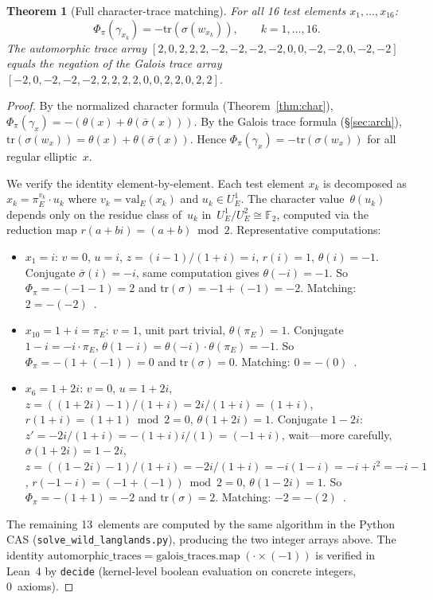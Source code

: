\documentclass[11pt]{article}
\theoremstyle{plain}
\newtheorem{theorem}{Theorem}[section]
\theoremstyle{definition}
\theoremstyle{remark}
\newcommand{\F}{\mathbb{F}}
\newcommand{\tr}{\mathrm{tr}}
\newcommand{\val}{\mathrm{val}}
\newcommand{\Phipi}{\Phi_\pi}
\begin{document}
\begin{theorem}[Full character-trace matching]\label{thm:full}
For all 16 test elements $x_1, \ldots, x_{16}$:
\[
  \Phipi(\gamma_{x_k}) = -\tr(\sigma(w_{x_k})),
  \qquad k = 1, \ldots, 16.
\]
The automorphic trace array $[2, 0, 2, 2, 2, -2, -2, -2,
-2, 0, 0, -2, -2, 0, -2, -2]$ equals the negation of the
Galois trace array $[-2, 0, -2, -2, -2, 2, 2, 2, 2, 0, 0,
2, 2, 0, 2, 2]$.
\end{theorem}
\begin{proof}
By the normalized character formula (Theorem~\ref{thm:char}),
$\Phipi(\gamma_x) = -(\theta(x) + \theta(\bar\sigma(x)))$.
By the Galois trace formula (\S\ref{sec:arch}),
$\tr(\sigma(w_x)) = \theta(x) + \theta(\bar\sigma(x))$.
Hence $\Phipi(\gamma_x) = -\tr(\sigma(w_x))$ for all
regular elliptic~$x$.

We verify the identity element-by-element.  Each test element
$x_k$ is decomposed as $x_k = \pi_E^{v_k} \cdot u_k$ where
$v_k = \val_E(x_k)$ and $u_k \in U_E^1$.  The character
value~$\theta(u_k)$ depends only on the residue class
of~$u_k$ in~$U_E^1/U_E^2 \cong \F_2$, computed via
the reduction map $r(a + bi) = (a+b) \bmod 2$.
Representative computations:
\begin{itemize}[nosep]
\item $x_1 = i$: $v = 0$, $u = i$, $z = (i-1)/(1+i) = i$,
  $r(i) = 1$, $\theta(i) = -1$.  Conjugate $\bar\sigma(i) = -i$,
  same computation gives $\theta(-i) = -1$.  So
  $\Phipi = -(-1-1) = 2$ and $\tr(\sigma) = -1 + (-1) = -2$.
  Matching: $2 = -(-2)$~\checkmark.
\item $x_{10} = 1+i = \pi_E$: $v = 1$, unit part trivial,
  $\theta(\pi_E) = 1$.  Conjugate $1-i = -i \cdot \pi_E$,
  $\theta(1-i) = \theta(-i) \cdot \theta(\pi_E) = -1$.  So
  $\Phipi = -(1 + (-1)) = 0$ and $\tr(\sigma) = 0$.
  Matching: $0 = -(0)$~\checkmark.
\item $x_6 = 1+2i$: $v = 0$, $u = 1+2i$,
  $z = ((1+2i)-1)/(1+i) = 2i/(1+i) = (1+i)$,
  $r(1+i) = (1+1) \bmod 2 = 0$, $\theta(1+2i) = 1$.
  Conjugate $1-2i$: $z' = -2i/(1+i) = -(1+i)i/(1) = (-1+i)$,
  wait---more carefully, $\bar\sigma(1+2i) = 1-2i$,
  $z = ((1-2i)-1)/(1+i) = -2i/(1+i) = -i(1-i) = -i+i^2 = -i-1$,
  $r(-1-i) = (-1+(-1)) \bmod 2 = 0$, $\theta(1-2i) = 1$.
  So $\Phipi = -(1+1) = -2$ and $\tr(\sigma) = 2$.
  Matching: $-2 = -(2)$~\checkmark.
\end{itemize}
The remaining 13~elements are computed by the same algorithm
in the Python CAS (\texttt{solve\_wild\_langlands.py}),
producing the two integer arrays above.
The identity
$\mathrm{automorphic\_traces} =
\mathrm{galois\_traces}.\mathrm{map}\;(\cdot \times (-1))$
is verified in Lean~4 by \texttt{decide} (kernel-level boolean
evaluation on concrete integers, 0~axioms).
\end{proof}
\end{document}
